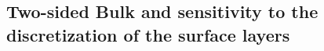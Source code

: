 \subsection{Two-sided Bulk and sensitivity to the discretization
	of the surface layers}
\label{sec:ND_Ocean_bulkRadiativeFluxes}

